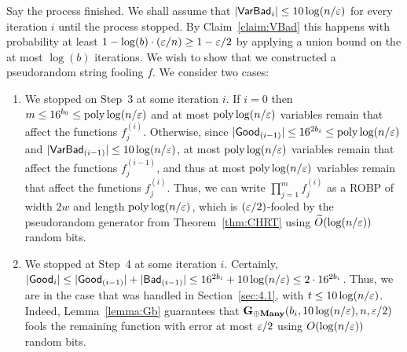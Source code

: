 Say the process finished. 
We shall assume that $|\mathsf{VarBad}_i| \le 10 \log(n/\varepsilon)$ for every iteration $i$ until the process stopped. By Claim~\ref{claim:VBad} this happens with probability at least $1-\log(b)\cdot(\varepsilon/n) \ge 1-\varepsilon/2$ by applying a union bound on the at most $\log(b)$ iterations.
We wish to show that we constructed a pseudorandom string fooling $f$. We consider two cases:
\begin{enumerate}
	\item 
	We stopped on Step~3 at some iteration $i$. If $i=0$ then $m \le 16^{b_0} \le {\mathrm{poly}}\log(n/\varepsilon)$ and at most ${\mathrm{poly}}\log(n/\varepsilon)$ variables remain that affect the functions $f_{j}^{(i)}$.
	 Otherwise, since $|\mathsf{Good}_{(i-1)}| \le 16^{2b_i} \le {\mathrm{poly}}\log(n/\varepsilon)$ and $|\mathsf{VarBad}_{(i-1)}| \le 10 \log(n/\varepsilon)$, at most ${\mathrm{poly}}\log(n/\varepsilon)$ variables remain that affect the functions $f_{j}^{(i-1)}$, and thus at most ${\mathrm{poly}}\log(n/\varepsilon)$ variables remain that affect the functions $f_{j}^{(i)}$.
Thus, we can write $\prod_{j=1}^{m} f_j^{(i)}$ as a ROBP of width $2w$ and length ${\mathrm{poly}}\log(n/\varepsilon)$, which is $(\varepsilon/2)$-fooled by the pseudorandom generator from Theorem~\ref{thm:CHRT} using  ${\widetilde O}(\log(n/\varepsilon))$ random bits.
	 
\item We stopped at Step~4 at some iteration $i$.
Certainly, $|\mathsf{Good}_{i}|\le  |\mathsf{Good}_{(i-1)}|+|\mathsf{Bad}_{(i-1)}| \le 16^{2b_i} + 10 \log(n/\varepsilon) \le 2\cdot 16^{2b_i}$.
Thus, we are in the case that was handled in Section~\ref{sec:4.1}, with $t \le 10 \log(n/\varepsilon)$. Indeed, Lemma~\ref{lemma:Gb} guarantees that $\mathbf{G_{\oplus Many}}(b_i,10\log(n/\varepsilon), n, \varepsilon/2)$ fools the remaining function with error at most $\varepsilon/2$ using $O(\log(n/\varepsilon))$ random bits.
\end{enumerate}


